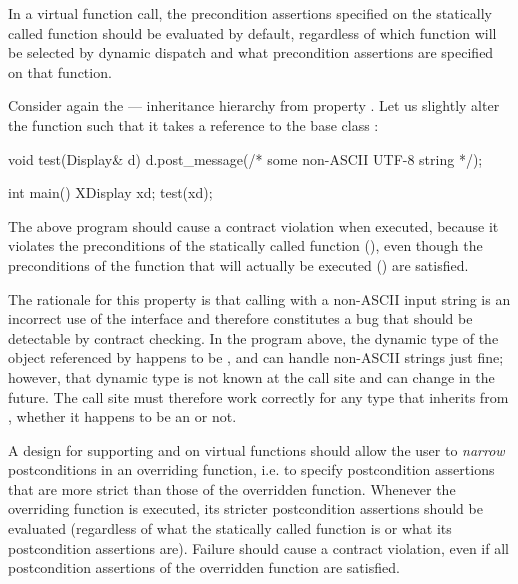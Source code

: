 
In a virtual function call, the precondition assertions specified on the statically called function should be evaluated by default, regardless of which function will be selected by dynamic dispatch and what  precondition assertions are specified on that function.

Consider again the  ---  inheritance hierarchy from property . Let us slightly alter the  function such that it takes a reference to the base class :
\begin{codeblock}
void test(Display& d) {
  d.post_message(/* some non-ASCII UTF-8 string */);
}

int main() {
  XDisplay xd;
  test(xd);
}
\end{codeblock}
The above program should cause a contract violation when executed, because it violates the preconditions of the statically called function (), even though the preconditions of the function that will actually be executed () are satisfied.

The rationale for this property is that calling  with a non-ASCII input string is an incorrect use of the  interface and therefore constitutes a bug that should be detectable by contract checking. In the program above, the dynamic type of the object referenced by  happens to be , and  can handle non-ASCII strings just fine; however, that dynamic type is not known at the call site and can change in the future. The call site must therefore work correctly for any type that inherits from , whether it happens to be an  or not.


A design for supporting  and  on virtual functions should allow the user to \emph{narrow} postconditions in an overriding function, i.e. to specify postcondition assertions that are more strict than those of the overridden function. Whenever the overriding function is executed, its stricter postcondition assertions should be evaluated (regardless of what the statically called function is or what its postcondition assertions are). Failure should cause a contract violation, even if all postcondition assertions of the overridden function are satisfied.

